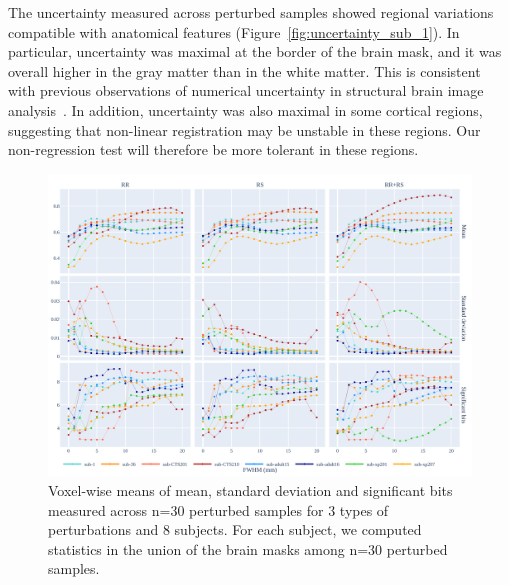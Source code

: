 \documentclass{article}
\begin{document}
The uncertainty measured across perturbed samples showed regional variations
compatible with anatomical features (Figure~\ref{fig:uncertainty_sub_1}).
In
particular, uncertainty was maximal at the border of the brain mask, and it was
overall higher in the gray matter than in the white matter. This is consistent
with previous observations of numerical uncertainty in structural brain image
analysis~\cite{salari2021accurate}. In addition, uncertainty was also maximal in
some cortical regions, suggesting that non-linear registration may be unstable
in these regions. Our non-regression test will therefore be more tolerant in
these regions.


\begin{figure}
    \centering
    \includegraphics[width=\linewidth]{figures/stats.pdf}
    \caption{Voxel-wise means of mean, standard deviation and significant bits
        measured across n=30 perturbed samples for 3 types of perturbations and 8
        subjects. For each subject, we computed statistics in the union of the brain
        masks among n=30 perturbed samples.}
    \label{fig:numerical-uncertainty}
\end{figure}
\end{document}
